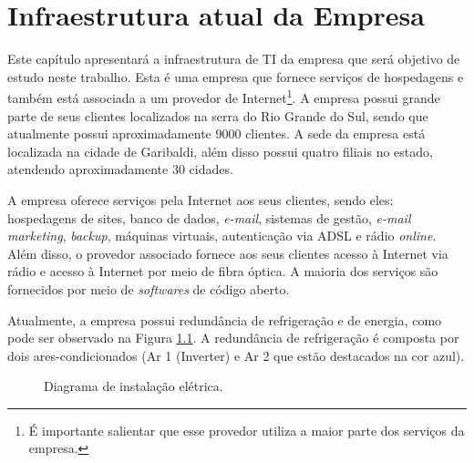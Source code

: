 \chapter{Infraestrutura atual da Empresa}
\label{cap:infraempresa}

Este capítulo apresentará a infraestrutura de \ac{TI} da empresa que será objetivo de estudo neste trabalho. Esta é uma empresa que fornece 
serviços de hospedagens e também está associada a um provedor de Internet\footnote[1]{É importante salientar que esse provedor utiliza a maior 
parte dos serviços da empresa.}. A empresa possui grande parte de seus clientes localizados na serra do Rio Grande do Sul, sendo que atualmente 
possui aproximadamente 9000 clientes. A sede da empresa está localizada na cidade de Garibaldi, além disso possui quatro filiais no estado, 
atendendo aproximadamente 30 cidades.

A empresa oferece serviços pela Internet aos seus clientes, sendo eles: hospedagens de sites, banco de dados, \textit{e-mail}, sistemas de gestão, 
\textit{e-mail marketing}, \textit{backup}, máquinas virtuais, autenticação via \ac{ADSL} e rádio \textit{online}.
Além disso, o provedor associado fornece aos seus clientes acesso à Internet via rádio e acesso à Internet por meio de fibra óptica.
A maioria dos serviços são fornecidos por meio de \textit{softwares} de código aberto.

Atualmente, a empresa possui redundância de refrigeração e de energia, como pode ser observado na Figura \ref{fig:insteletrica}. 
A redundância de refrigeração é composta por dois ares-condicionados (Ar 1 (Inverter) e Ar 2 que estão destacados na cor azul). 

\begin{figure}[h!]
 \centering
 \caption{Diagrama de instalação elétrica.}
 \label{fig:insteletrica}
\end{figure}

